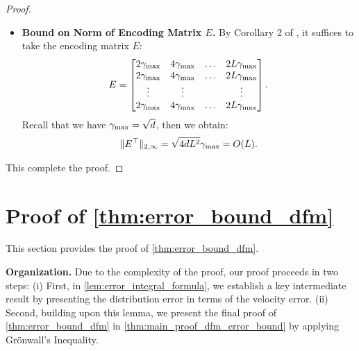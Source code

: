\documentclass[12pt]{article}
\numberwithin{equation}{section}
\let\cite\citep
\theoremstyle{theoremstyle}
\numberwithin{equation}{section}
\numberwithin{theorem}{section}
\numberwithin{proposition}{section}
\numberwithin{definition}{section}
\numberwithin{lemma}{section}
\numberwithin{assumption}{section}
\numberwithin{remark}{section}
\begin{document}
\begin{proof}
\begin{itemize}
\item \textbf{Bound on Norm of Encoding Matrix $E$.}
By Corollary 2 of \cite{kajitsuka2023transformers}, it suffices to take the encoding matrix $E$:
\begin{align*}
E=
    \begin{bmatrix}
        2\gamma_{\rm max} & 4\gamma_{\rm max} & \dots & 2L\gamma_{\rm max} \\
         2\gamma_{\rm max} & 4\gamma_{\rm max} & \dots & 2L\gamma_{\rm max} \\
         \vdots & \vdots & &\vdots \\
         2\gamma_{\rm max} & 4\gamma_{\rm max} & \dots & 2L\gamma_{\rm max}
    \end{bmatrix}.
\end{align*}
Recall that we have $\gamma_{\rm max}=\sqrt{d}$, then we obtain:
\begin{align*}
    \|E^\top\|_{2,\infty}=\sqrt{4dL^2}\gamma_{\rm max}=O(L).
\end{align*}
\end{itemize}
This complete the proof.
\end{proof}








\clearpage





\clearpage

\section{\texorpdfstring{Proof of \cref{thm:error_bound_dfm}}{Proof of Theorem \ref{thm:error_bound_dfm}}}
\label{sec:proof_dfm_error_bound}

This section provides the proof of \cref{thm:error_bound_dfm}. 

\textbf{Organization.}
Due to the complexity of the proof, our proof proceeds in two steps: (i) First, in \cref{lem:error_integral_formula}, we establish a key intermediate result by presenting the distribution error in terms of the velocity error. 
(ii) Second, building upon this lemma, we present the final proof of \cref{thm:error_bound_dfm} in \cref{thm:main_proof_dfm_error_bound} by applying Grönwall’s Inequality.
\end{document}
